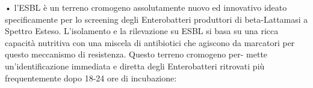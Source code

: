 \documentclass[11pt]{report}
\begin{document}
• l’ESBL è un terreno cromogeno assolutamente nuovo ed innovativo ideato specificamente per
lo screening degli Enterobatteri produttori di beta-Lattamasi a Spettro Esteso. L’isolamento e la
rilevazione su ESBL si basa su una ricca capacità nutritiva con una miscela di antibiotici che
agiscono da marcatori per questo meccanismo di resistenza. Questo terreno cromogeno per-
mette un’identificazione immediata e diretta degli Enterobatteri ritrovati più frequentemente
dopo 18-24 ore di incubazione:
















\end{document}
